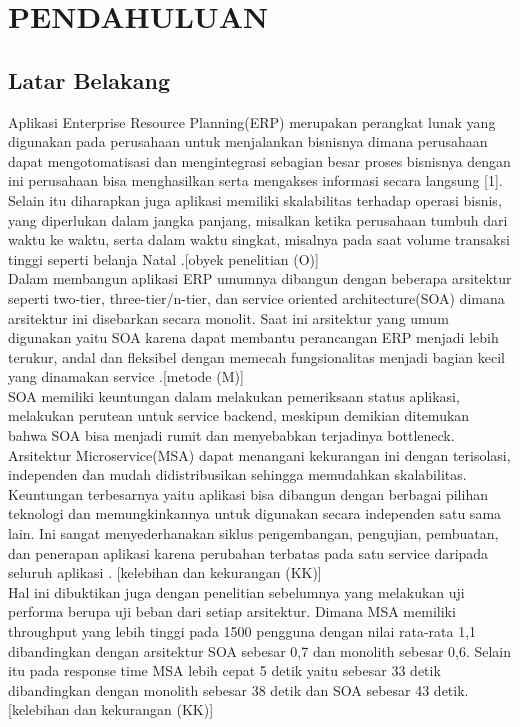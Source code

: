 \chapter{PENDAHULUAN}
\section{Latar Belakang}
Aplikasi Enterprise Resource Planning(ERP) merupakan perangkat lunak yang digunakan pada perusahaan untuk menjalankan bisnisnya dimana perusahaan dapat mengotomatisasi dan mengintegrasi sebagian besar proses bisnisnya dengan ini perusahaan bisa menghasilkan serta mengakses informasi secara langsung [1]. Selain itu diharapkan juga aplikasi memiliki skalabilitas terhadap operasi bisnis, yang diperlukan dalam jangka panjang, misalkan ketika perusahaan tumbuh dari waktu ke waktu, serta dalam waktu singkat, misalnya pada saat volume transaksi tinggi seperti belanja Natal \cite{1}.{\color{red}[obyek penelitian (O)]}\\

Dalam membangun aplikasi ERP umumnya dibangun dengan beberapa arsitektur seperti two-tier, three-tier/n-tier, dan service oriented architecture(SOA) dimana arsitektur ini disebarkan secara monolit. Saat ini arsitektur yang umum digunakan yaitu SOA karena dapat membantu perancangan ERP menjadi lebih terukur, andal dan fleksibel dengan memecah fungsionalitas menjadi bagian kecil yang dinamakan service \cite{1}.{\color{red}[metode (M)]}\\

SOA memiliki keuntungan dalam melakukan pemeriksaan status aplikasi, melakukan perutean untuk service backend, meskipun demikian ditemukan bahwa SOA bisa menjadi rumit dan menyebabkan terjadinya bottleneck. Arsitektur Microservice(MSA) dapat menangani kekurangan ini dengan terisolasi, independen dan mudah didistribusikan sehingga memudahkan skalabilitas. Keuntungan terbesarnya yaitu aplikasi bisa dibangun dengan berbagai pilihan teknologi dan memungkinkannya untuk digunakan secara independen satu sama lain. Ini sangat menyederhanakan siklus pengembangan, pengujian, pembuatan, dan penerapan aplikasi karena perubahan terbatas pada satu service daripada seluruh aplikasi \cite{3}. {\color{red}[kelebihan dan kekurangan (KK)]}\\

Hal ini dibuktikan juga dengan penelitian sebelumnya yang melakukan uji performa berupa uji beban dari setiap arsitektur. Dimana MSA memiliki throughput yang lebih tinggi pada 1500 pengguna dengan nilai rata-rata 1,1 dibandingkan dengan arsitektur SOA sebesar 0,7 dan monolith sebesar 0,6. Selain itu pada response time MSA lebih cepat 5 detik yaitu sebesar 33 detik dibandingkan dengan monolith sebesar 38 detik dan SOA sebesar 43 detik. {\color{red}[kelebihan dan kekurangan (KK)]}\\ 

